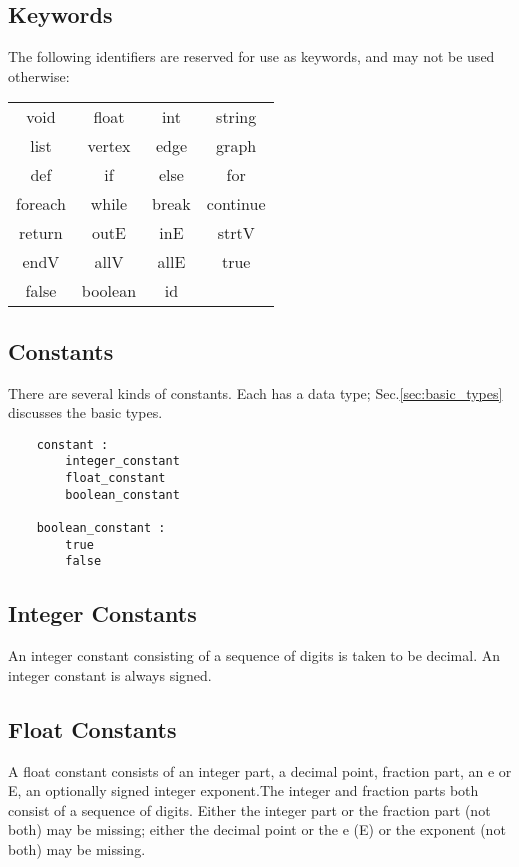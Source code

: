 \documentclass[letterpaper,12pt]{article}
\begin{document}
\subsection{Keywords}
The following identifiers are reserved for use as keywords, and may not be used otherwise:
\begin{table}
\begin{center}
\begin{tabular}{cccc}
        void    &    float   &    int   &      string    \\
        list    &    vertex  &    edge  &      graph     \\
        def     &    if      &    else  &      for       \\
        foreach &    while   &    break &      continue  \\
        return  &    outE    &    inE   &      strtV     \\
        endV    &    allV    &    allE  &      true      \\
        false   &    boolean &    id    &                \\
\end{tabular}
\end{center}
\end{table}

\subsection{Constants}\label{sec:constants}
There are several kinds of constants. Each has a data type; Sec.\ref{sec:basic_types}  discusses the basic types.
\begin{lstlisting}
	constant :
		integer_constant
		float_constant
		boolean_constant

	boolean_constant :
		true
		false
\end{lstlisting}

\subsection{Integer Constants}
An integer constant consisting of a sequence of digits is taken to be decimal. An integer constant is always signed.

\subsection{Float Constants}
A float constant consists of an integer part, a decimal point, fraction part, an e or E, an optionally signed integer exponent.The integer and fraction parts both consist of a sequence of digits. Either the integer part or the fraction part (not both) may be missing; either the decimal point or the e (E) or the exponent (not both) may be missing.
\end{document}
